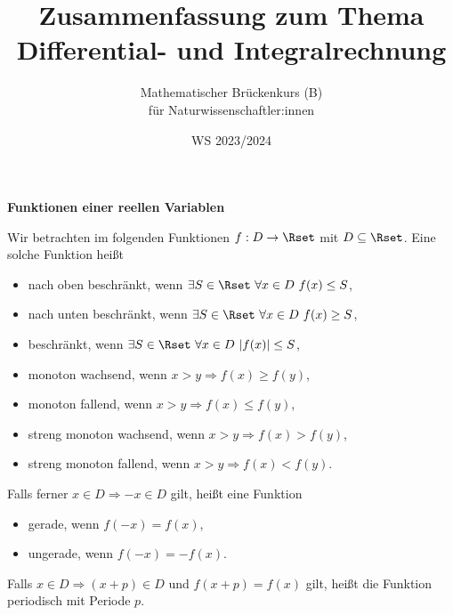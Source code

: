 \documentclass[a4paper,10pt]{article}
\title{Zusammenfassung zum Thema \\ Differential- und Integralrechnung}
\author{Mathematischer Brückenkurs (B)\\für Naturwissenschaftler:innen}
\date{WS 2023/2024}
\begin{document}
\parindent0pt
\maketitle

{\bf Funktionen einer reellen Variablen}

Wir betrachten im folgenden Funktionen $f:D\to\Rset$ mit $D\subseteq\Rset$.
Eine solche Funktion heißt
\begin{itemize}\setlength\itemsep{0pt}\parskip0pt\setlength\parsep{0pt}
\item {nach oben beschränkt}, wenn $\exists S\in\Rset~\forall x\in D~f(x)\le S$,
\item {nach unten beschränkt}, wenn $\exists S\in\Rset~\forall x\in D~f(x)\ge S$,
\item {beschränkt}, wenn $\exists S\in\Rset~\forall x\in D~|f(x)|\le S$,
\item {monoton wachsend}, wenn $x>y\Rightarrow f(x)\ge f(y)$,
\item {monoton fallend}, wenn $x>y\Rightarrow f(x)\le f(y)$,
\item {streng monoton wachsend}, wenn $x>y\Rightarrow f(x)>f(y)$, 
\item {streng monoton fallend}, wenn $x>y\Rightarrow f(x)<f(y)$.
\end{itemize}
Falls ferner $x\in D\Rightarrow -x\in D$ gilt, heißt eine Funktion
\begin{itemize}\setlength\itemsep{0pt}\parskip0pt\setlength\parsep{0pt}
\item {gerade}, wenn $f(-x)=f(x)$,
\item {ungerade}, wenn $f(-x)=-f(x)$.
\end{itemize}
Falls $x\in D\Rightarrow (x+p)\in D$ und $f(x+p)=f(x)$ gilt, heißt die
Funktion periodisch mit Periode $p$.
\end{document}
